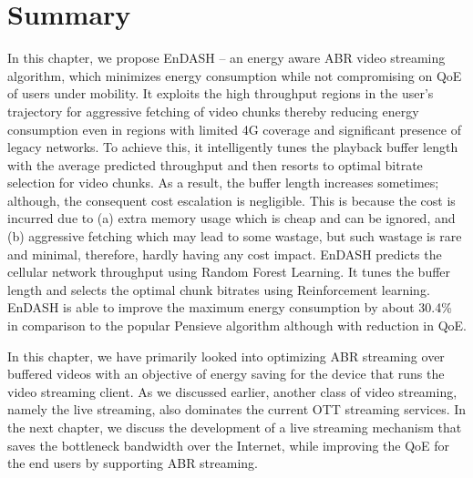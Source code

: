 \section{Summary}\label{sec:chap04:conclusion}
\acresetall
In this chapter, we propose EnDASH -- an energy aware \ac{ABR} video streaming algorithm, which minimizes energy consumption while not compromising on \ac{QoE} of users under mobility. It exploits the high throughput regions in the user's trajectory for aggressive fetching of video chunks thereby reducing energy consumption even in regions with limited \ac{4G} coverage and significant presence of legacy networks.  To achieve this, it intelligently tunes the playback buffer length with the average predicted throughput and then resorts to optimal bitrate selection for video chunks. As a result, the buffer length increases sometimes; although, the consequent cost  escalation is negligible. This is because the cost is incurred due to  (a) extra memory usage which is cheap  and can be ignored, and (b) aggressive fetching which may lead to some wastage, but such wastage is rare and minimal, therefore, hardly having any cost impact. %
EnDASH predicts the cellular network throughput using Random Forest Learning. It tunes the buffer length and selects the optimal chunk bitrates using Reinforcement learning. EnDASH is able to improve the maximum energy consumption by about 30.4\% in comparison to the popular Pensieve algorithm although with reduction in \ac{QoE}. 

In this chapter, we have primarily looked into optimizing \ac{ABR} streaming over buffered videos with an objective of energy saving for the device that runs the video streaming client. As we discussed earlier, another class of video streaming, namely the live streaming, also dominates the current \ac{OTT} streaming services. In the next chapter, we discuss the development of a live streaming mechanism that saves the bottleneck bandwidth over the Internet, while improving the QoE for the end users by supporting \ac{ABR} streaming. 